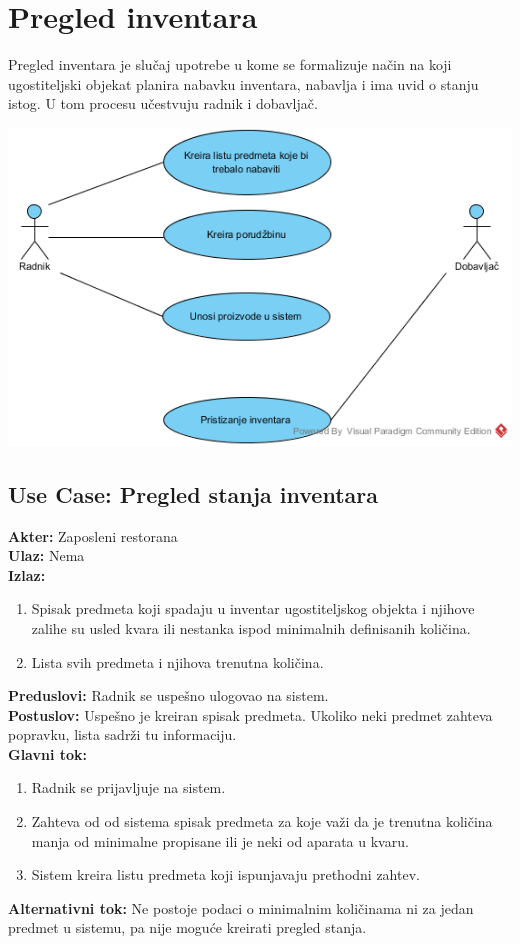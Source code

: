 \documentclass{article}
\begin{document}
\section{Pregled inventara}
Pregled inventara je slučaj upotrebe u kome se formalizuje način na koji ugostiteljski objekat planira nabavku inventara, nabavlja i ima uvid o stanju istog. U tom procesu učestvuju radnik i dobavljač. 

\includegraphics[width=\textwidth]{pregled_inventara.png}
\subsection{\textbf{Use Case}: Pregled stanja inventara}
\textbf{Akter:} Zaposleni restorana\\
\textbf{Ulaz:} Nema\\
\textbf{Izlaz:} 
\begin{enumerate}
	\item Spisak predmeta koji spadaju u inventar ugostiteljskog objekta i njihove zalihe su usled kvara ili nestanka ispod minimalnih definisanih količina.
	\item Lista svih predmeta i njihova trenutna količina.
\end{enumerate} 
\textbf{Preduslovi:} Radnik se uspešno ulogovao na sistem.\\
\textbf{Postuslov:} Uspešno je kreiran spisak predmeta. Ukoliko neki predmet zahteva popravku, lista sadrži tu informaciju.\\
\textbf{Glavni tok:} 
\begin{enumerate}
	\item Radnik se prijavljuje na sistem.
	\item Zahteva od  od sistema spisak predmeta za koje važi da je trenutna količina manja od minimalne propisane ili je neki od aparata u kvaru.
	\item Sistem kreira listu predmeta koji ispunjavaju prethodni zahtev.
\end{enumerate}
\textbf{Alternativni tok:} Ne postoje podaci o minimalnim količinama ni za jedan predmet u sistemu, pa nije moguće kreirati pregled stanja.\\
\end{document}
